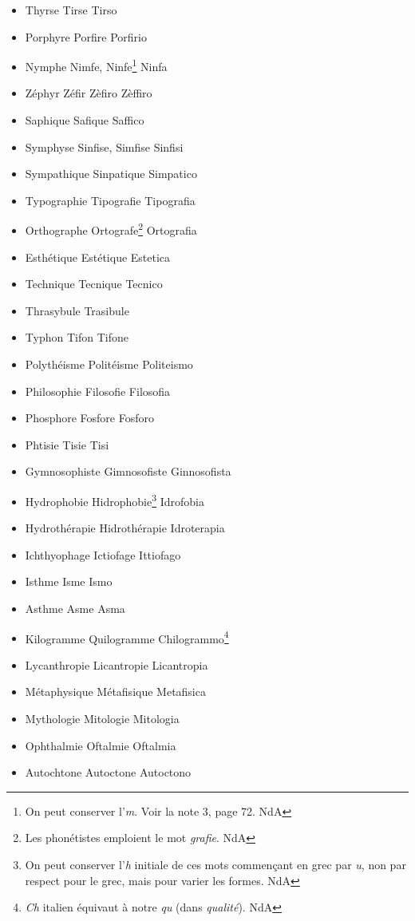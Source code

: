 \documentclass[french,twoside]{book} %
\begin{document}
\begin{itemize}[itemsep=0pt,]
\item Thyrse Tirse Tirso
\item Porphyre Porfire Porfirio
\item Nymphe Nimfe, Ninfe\footnote{ On peut conserver l’{\itshape m}. Voir la note 3, page 72. NdA} Ninfa
\item Zéphyr Zéfir Zèfiro Zèffiro
\item Saphique Safique Saffico
\item Symphyse Sinfise, Simfise Sinfisi
\item Sympathique Sinpatique Simpatico
\item Typographie Tipografie Tipografia
\item Orthographe Ortografe\footnote{ Les phonétistes emploient le mot {\itshape grafie}. NdA} Ortografia
\item Esthétique Estétique Estetica
\item Technique Tecnique Tecnico
\item Thrasybule Trasibule
\item Typhon Tifon Tifone
\item Polythéisme Politéisme Politeismo
\item Philosophie Filosofie Filosofia
\item Phosphore Fosfore Fosforo
\item Phtisie Tisie Tisi
\item Gymnosophiste Gimnosofiste Ginnosofista
\item Hydrophobie Hidrophobie\footnote{ On peut conserver l’{\itshape h} initiale de ces mots commençant en grec par {\itshape u}, non par respect pour le grec, mais pour varier les formes. NdA} Idrofobia
\item Hydrothérapie Hidrothérapie Idroterapia
\item Ichthyophage Ictiofage Ittiofago
\item Isthme Isme Ismo
\item Asthme Asme Asma
\item Kilogramme Quilogramme Chilogrammo\footnote{ {\itshape Ch} italien équivaut à notre {\itshape qu} (dans {\itshape qualité}). NdA}
\item Lycanthropie Licantropie Licantropia
\item Métaphysique Métafisique Metafisica
\item Mythologie Mitologie Mitologia
\item Ophthalmie Oftalmie Oftalmia
\item Autochtone Autoctone Autoctono

\end{itemize}
\end{document}
